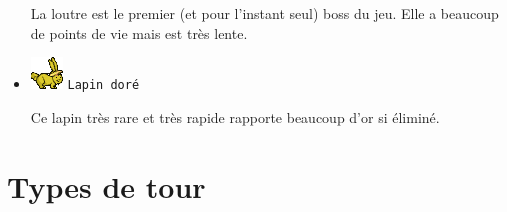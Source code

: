 \documentclass{article}
\begin{document}
\begin{itemize}
La loutre est le premier (et pour l'instant seul) boss du jeu. Elle a beaucoup
de points de vie mais est tr\`es lente.

\item \includegraphics{goldenbunny_alt1.png} \texttt{Lapin dor\'e}

Ce lapin tr\`es rare et tr\`es rapide rapporte beaucoup d'or si \'elimin\'e.

\end{itemize}

\section{Types de tour}
\end{document}

